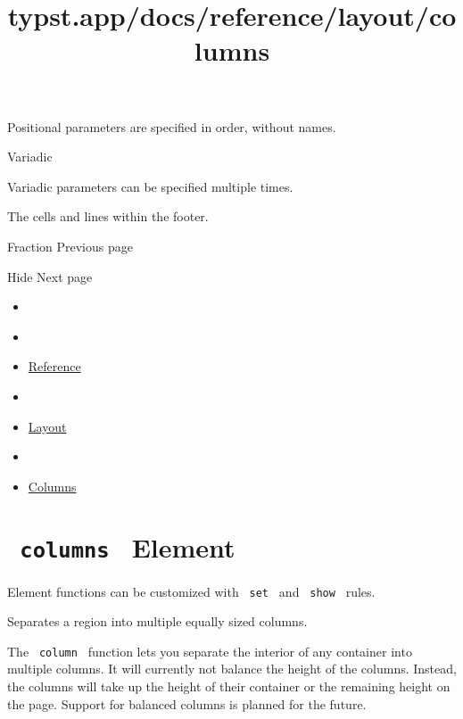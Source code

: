 \label{definitions-footer-children-positional-tooltip}
Positional parameters are specified in order, without names.

{{ Variadic }}

\label{definitions-footer-children-variadic-tooltip}
Variadic parameters can be specified multiple times.

The cells and lines within the footer.

\href{/docs/reference/layout/fraction/}{\pandocbounded{}}

{ Fraction } { Previous page }

\href{/docs/reference/layout/hide/}{\pandocbounded{}}

{ Hide } { Next page }


\title{typst.app/docs/reference/layout/columns}

\begin{itemize}
\tightlist
\item
  \href{/docs}{}
\item
  
\item
  \href{/docs/reference/}{Reference}
\item
  
\item
  \href{/docs/reference/layout/}{Layout}
\item
  
\item
  \href{/docs/reference/layout/columns/}{Columns}
\end{itemize}

\section{\texorpdfstring{\texttt{\ columns\ } {{ Element
}}}{ columns   Element }}\label{summary}

\label{element-tooltip}
Element functions can be customized with \texttt{\ set\ } and
\texttt{\ show\ } rules.

Separates a region into multiple equally sized columns.

The \texttt{\ column\ } function lets you separate the interior of any
container into multiple columns. It will currently not balance the
height of the columns. Instead, the columns will take up the height of
their container or the remaining height on the page. Support for
balanced columns is planned for the future.

